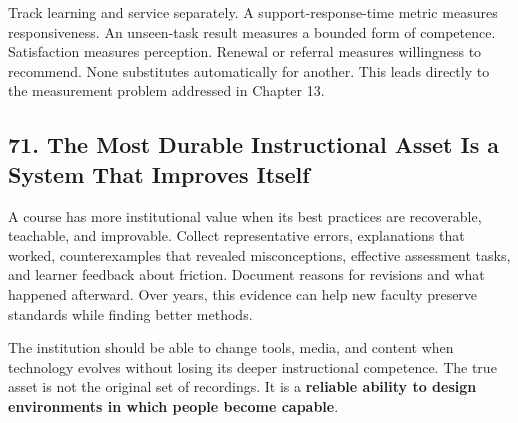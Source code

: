 Track learning and service separately. A support-response-time metric measures responsiveness. An unseen-task result measures a bounded form of competence. Satisfaction measures perception. Renewal or referral measures willingness to recommend. None substitutes automatically for another. This leads directly to the measurement problem addressed in Chapter 13.

\subsection*{71. The Most Durable Instructional Asset Is a System That Improves Itself}

A course has more institutional value when its best practices are recoverable, teachable, and improvable. Collect representative errors, explanations that worked, counterexamples that revealed misconceptions, effective assessment tasks, and learner feedback about friction. Document reasons for revisions and what happened afterward. Over years, this evidence can help new faculty preserve standards while finding better methods.

The institution should be able to change tools, media, and content when technology evolves without losing its deeper instructional competence. The true asset is not the original set of recordings. It is a \textbf{reliable ability to design environments in which people become capable}.
